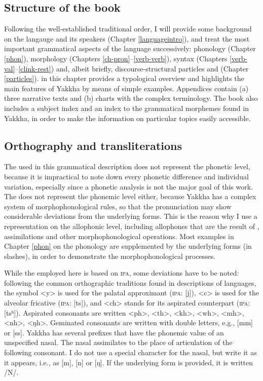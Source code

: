 \subsection{Structure of the book}


Following the well-established traditional order, I will provide some background on the langauge and its speakers (Chapter \ref{languageintro}), and treat the most important grammatical aspects of the language successively: phonology (Chapter \ref{phon}), morphology (Chapters \ref{ch-pron}–\ref{verb-verb}), syntax (Chapters \ref{verb-val}–\ref{clink-rest}) and, albeit briefly, discourse-structural particles and  (Chapter \ref{particles}).  in this chapter provides a typological overview and highlights the main features of Yakkha by means of simple examples. Appendices contain (a) three narrative texts and  (b) charts with the complex  terminology. The book also includes  a subject index and an index to the grammatical morphemes found in Yakkha, in order to make the information on particular topics easily accessible. 

\subsection{Orthography and transliterations}\label{orth}

The  used in this grammatical description does not represent the phonetic level, because it is impractical to note down every phonetic difference and individual variation, especially since a phonetic analysis is not the major goal of this work. The  does not represent the phonemic level either, because Yakkha has a complex system of morphophonological rules, so that the pronunciation may show considerable deviations from the underlying forms. This is the reason why I use a representation on the allophonic level, including allophones that are the result of , assimilations and other morphophonological operations. Most examples in Chapter \ref{phon} on the phonology  are supplemented by the underlying forms (in slashes), in order to demonstrate the morphophonological processes.

While the   employed here is based on \textsc{ipa}, some deviations have to be noted: following the common orthographic traditions found in descriptions of  languages, the symbol <y> is used for the palatal approximant (\textsc{ipa}: [j]), <c> is used for the alveolar fricative (\textsc{ipa}: [ts]), and <ch> stands for its aspirated counterpart (\textsc{ipa}: [tsʰ]). Aspirated consonants are written <ph>, <th>, <kh>, <wh>, <mh>, <nh>, <ŋh>. Geminated consonants are written with double letters, e.g., [mm] or [ss]. Yakkha has several prefixes that have the phonemic value of an unspecified  nasal. The nasal assimilates to the place of articulation of the following consonant. I do not use a special character for the nasal, but write it as it appears, i.e., as [m], [n] or [ŋ]. If the underlying form is provided, it is written /N/. 

